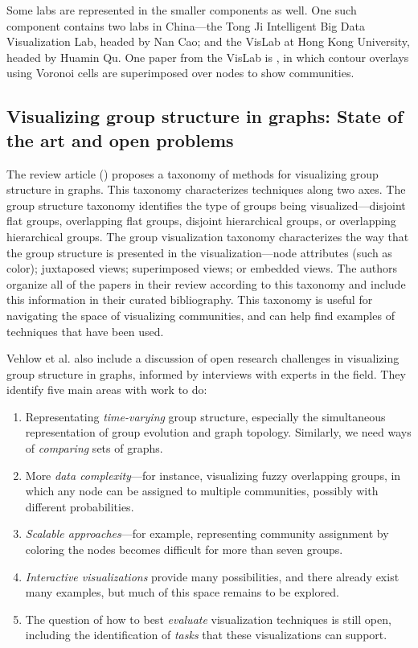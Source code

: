 Some labs are represented in the smaller components as well. One such
component contains two labs in China---the Tong Ji Intelligent Big Data
Visualization Lab, headed by Nan Cao; and the VisLab at Hong Kong
University, headed by Huamin Qu. One paper from the VisLab is
\autocite{wu_interactive_2015}, in which contour overlays using Voronoi
cells are superimposed over nodes to show communities.

\subsection{Visualizing group structure in graphs: State of the art and
open
problems}\label{visualizing-group-structure-in-graphs-state-of-the-art-and-open-problems}

The review article (\autocite{vehlow_state_2015}) proposes a taxonomy of
methods for visualizing group structure in graphs. This taxonomy
characterizes techniques along two axes. The group structure taxonomy
identifies the type of groups being visualized---disjoint flat groups,
overlapping flat groups, disjoint hierarchical groups, or overlapping
hierarchical groups. The group visualization taxonomy characterizes the
way that the group structure is presented in the visualization---node
attributes (such as color); juxtaposed views; superimposed views; or
embedded views. The authors organize all of the papers in their review
according to this taxonomy and include this information in their curated
bibliography. This taxonomy is useful for navigating the space of
visualizing communities, and can help find examples of techniques that
have been used.


Vehlow et al. also include a discussion of open research challenges in
visualizing group structure in graphs, informed by interviews with
experts in the field. They identify five main areas with work to do:

\begin{enumerate}
\def\labelenumi{\arabic{enumi}.}
\tightlist
\item
  Representating \emph{time-varying} group structure, especially the
  simultaneous representation of group evolution and graph topology.
  Similarly, we need ways of \emph{comparing} sets of graphs.
\item
  More \emph{data complexity}---for instance, visualizing fuzzy
  overlapping groups, in which any node can be assigned to multiple
  communities, possibly with different probabilities.
\item
  \emph{Scalable approaches}---for example, representing community
  assignment by coloring the nodes becomes difficult for more than seven
  groups.
\item
  \emph{Interactive visualizations} provide many possibilities, and
  there already exist many examples, but much of this space remains to
  be explored.
\item
  The question of how to best \emph{evaluate} visualization techniques
  is still open, including the identification of \emph{tasks} that these
  visualizations can support.
\end{enumerate}

